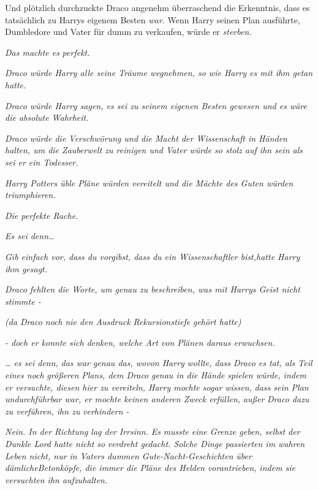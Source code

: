 {Und plötzlich durchzuckte Draco angenehm überraschend die Erkenntnis, dass es tatsächlich zu Harrys eigenem Besten \emph{war.} Wenn Harry seinen Plan ausführte, Dumbledore und Vater für dumm zu verkaufen, würde er \emph{sterben.}

\emph{Das machte es} \emph{\emph{perfekt.}}

\emph{Draco würde Harry alle seine Träume wegnehmen, so wie Harry es mit ihm getan hatte.}

\emph{Draco würde Harry sagen, es sei zu seinem eigenen Besten gewesen und es wäre die absolute Wahrheit.}

\emph{Draco würde die Verschwörung und die Macht der Wissenschaft in Händen halten, um die Zauberwelt zu reinigen und Vater würde so stolz auf ihn sein als sei er ein Todesser.}

\emph{Harry Potters üble Pläne würden vereitelt und die Mächte des Guten würden triumphieren.}

\emph{Die perfekte Rache.}

\emph{Es sei denn…}

\emph{\emph{G}\emph{ib einfach vor, dass du vorgibst, dass du ein Wissenschaftler bist,}hatte Harry ihm gesagt.}

\emph{Draco fehlten die Worte, um genau zu beschreiben, was mit Harrys Geist nicht stimmte -}

\emph{(da Draco noch} \emph{nie den Ausdruck} \emph{\emph{Rekursionstiefe}} \emph{gehört hatte)}

\emph{- doch er konnte sich denken, welche Art von Plänen daraus erwuchsen.}

\emph{… es sei denn,} \emph{das war genau das, wovon Harry} \emph{\emph{wollte,}} \emph{dass Draco es tat, als Teil eines noch} \emph{\emph{größeren}} \emph{Plans, dem Draco} \emph{\emph{genau in die Hände}} \emph{spielen würde, indem er versuchte, diesen hier zu vereiteln, Harry mochte sogar} \emph{\emph{wissen,}} \emph{dass sein Plan undurchführbar war, er mochte keinen anderen Zweck erfüllen,} \emph{\emph{außer}} \emph{Draco dazu zu verführen, ihn zu} \emph{verhindern -}

\emph{Nein. In der Richtung lag der} \emph{\emph{Irrsinn.}} \emph{Es} \emph{\emph{musste}} \emph{eine Grenze geben, selbst der Dunkle Lord hatte nicht} \emph{\emph{so}} \emph{verdreht gedacht. Solche Dinge passierten im wahren Leben nicht, nur in Vaters dummen Gute-Nacht-Geschichten} \emph{über} \emph{dämlicheBetonköpfe, die immer die} \emph{Pläne des Helden} \emph{vorantrieben, indem sie versuchten ihn aufzuhalten.}

}
